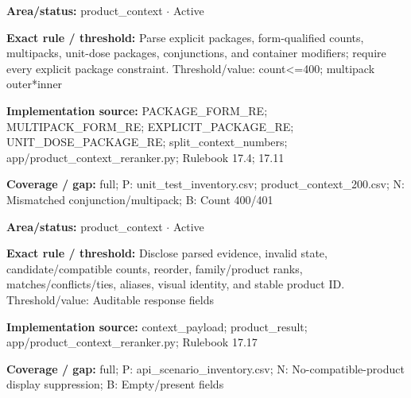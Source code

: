 \begin{tcolorbox}[enhanced,breakable,colback=white,colframe=Muted!45,boxrule=0.45pt,arc=1.5pt,left=6pt,right=6pt,top=5pt,bottom=5pt,title={\texttt{PC-PACKAGE-PARSE-09}},title after break={\texttt{PC-PACKAGE-PARSE-09}\ (continued)},fonttitle=\headingfont\bfseries\color{Navy},coltitle=Navy]
\textbf{Area/status:} product\_\allowbreak{}context $\boldsymbol{\cdot}$ Active\par
\smallskip
\textbf{Exact rule / threshold:} Parse explicit packages, form-qualified counts, multipacks, unit-dose packages, conjunctions, and container modifiers; require every explicit package constraint. Threshold/\allowbreak{}value: count<=400; multipack outer*inner\par
\smallskip
\textbf{Implementation source:} PACKAGE\_\allowbreak{}FORM\_\allowbreak{}RE; MULTIPACK\_\allowbreak{}FORM\_\allowbreak{}RE; EXPLICIT\_\allowbreak{}PACKAGE\_\allowbreak{}RE; UNIT\_\allowbreak{}DOSE\_\allowbreak{}PACKAGE\_\allowbreak{}RE; split\_\allowbreak{}context\_\allowbreak{}numbers; app/\allowbreak{}product\_\allowbreak{}context\_\allowbreak{}reranker.py; Rulebook 17.4; 17.11\par
\smallskip
\textbf{Coverage / gap:} full; P: unit\_\allowbreak{}test\_\allowbreak{}inventory.csv; product\_\allowbreak{}context\_\allowbreak{}200.csv; N: Mismatched conjunction/\allowbreak{}multipack; B: Count 400/\allowbreak{}401
\end{tcolorbox}
\begin{tcolorbox}[enhanced,breakable,colback=white,colframe=Muted!45,boxrule=0.45pt,arc=1.5pt,left=6pt,right=6pt,top=5pt,bottom=5pt,title={\texttt{PC-PAYLOAD-26}},title after break={\texttt{PC-PAYLOAD-26}\ (continued)},fonttitle=\headingfont\bfseries\color{Navy},coltitle=Navy]
\textbf{Area/status:} product\_\allowbreak{}context $\boldsymbol{\cdot}$ Active\par
\smallskip
\textbf{Exact rule / threshold:} Disclose parsed evidence, invalid state, candidate/\allowbreak{}compatible counts, reorder, family/\allowbreak{}product ranks, matches/\allowbreak{}conflicts/\allowbreak{}ties, aliases, visual identity, and stable product ID. Threshold/\allowbreak{}value: Auditable response fields\par
\smallskip
\textbf{Implementation source:} context\_\allowbreak{}payload; product\_\allowbreak{}result; app/\allowbreak{}product\_\allowbreak{}context\_\allowbreak{}reranker.py; Rulebook 17.17\par
\smallskip
\textbf{Coverage / gap:} full; P: api\_\allowbreak{}scenario\_\allowbreak{}inventory.csv; N: No-compatible-product display suppression; B: Empty/\allowbreak{}present fields
\end{tcolorbox}
